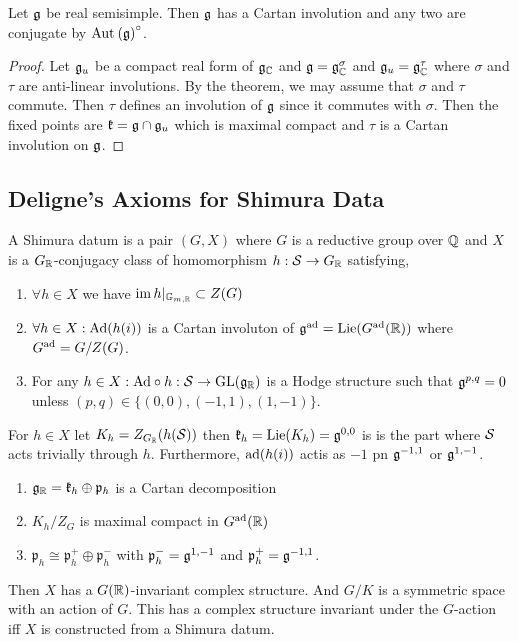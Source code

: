 \documentclass[12pt]{article}
\begin{document}
\begin{theorem}
Let $\g$ be real semisimple. Then $\g$ has a Cartan involution and any two are conjugate by $\Aut{\g}^\circ$. 
\end{theorem}

\begin{proof}
Let $\g_u$ be a compact real form of $\g_{\CC}$ and $\g = \g_{\CC}^\sigma$ and $\g_u = \g_{\CC}^{\tau}$ where $\sigma$ and $\tau$ are anti-linear involutions. By the theorem, we may assume that $\sigma$ and $\tau$ commute. Then $\tau$ defines an involution of $\g$ since it commutes with $\sigma$. Then the fixed points are $\mathfrak{k} = \g \cap \g_u$ which is maximal compact and $\tau$ is a Cartan involution on $\g$. 
\end{proof}

\subsection{Deligne's Axioms for Shimura Data}

\renewcommand{\k}{\mathfrak{k}}
\renewcommand{\p}{\mathfrak{p}}

\begin{defn}
A Shimura datum is a pair $(G, X)$ where $G$ is a reductive group over $\Q$ and $X$ is a $G_{\RR}$-conjugacy class of homomorphism $h : \S \to G_{\RR}$ satisfying,
\begin{enumerate}
\item $\forall h \in X$ we have $\im{h|_{\mathbb{G}_{m, \RR}}} \subset Z(G)$
\item $\forall h \in X : \Ad(h(i))$ is a Cartan involuton of $\g^{\ad} = \Lie(G^\ad(\RR))$ where $G^\ad = G / Z(G)$. 
\item For any $h \in X : \Ad \circ h : \S \to \GL(\g_{\RR})$ is a Hodge structure such that $\g^{p,q} = 0$ unless $(p, q) \in \{ (0,0), (-1,1), (1, -1) \}$. 
\end{enumerate}
\end{defn}

\begin{rmk}
For $h \in X$ let $K_h = Z_{G_{\RR}}(h(\S))$ then $\k_h = \Lie(K_h) = \g^{0,0}$ is is the part where $\S$ acts trivially through $h$. Furthermore, $\ad(h(i))$ actis as $-1$ pn $\g^{-1,1}$ or $\g^{1,-1}$. 

\begin{enumerate}
\item $\g_{\RR} = \k_h \oplus \p_h$ is a Cartan decomposition
\item $K_h / Z_G$ is maximal compact in $G^\ad(\RR)$
\item $\p_h \cong \p_h^{+} \oplus \p_h^{-}$ with $\p_h^{-} = \g^{1,-1}$ and $\p_h^{+} = \g^{-1,1}$.
\end{enumerate}
Then $X$ has a $G(\RR)$-invariant complex structure. And $G / K$ is a symmetric space with an action of $G$. This has a complex structure invariant under the $G$-action iff $X$ is constructed from a Shimura datum. 
\end{rmk}
\end{document}

